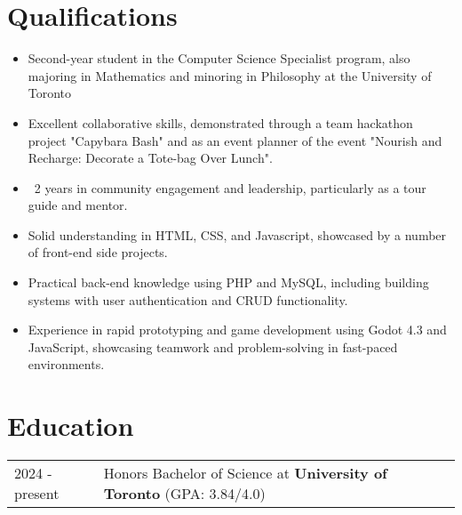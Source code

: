 \documentclass[a4paper,10pt]{article} %
\makeatletter
\newenvironment{joblong}[2]
    {
    \begin{tabularx}{\linewidth}{@{}l X r@{}}
    \textbf{#1} & \hfill &  #2 \\[3.75pt]
    \end{tabularx}
    \begin{minipage}[t]{\linewidth}
    \begin{itemize}[nosep,after=\strut, leftmargin=1em, itemsep=3pt,label=--]
    }
    {
    \end{itemize}
    \end{minipage}    
    }
\makeatother
\begin{document}


\section{Qualifications}
\begin{itemize}
    \item Second-year student in the Computer Science Specialist program, also majoring in Mathematics and minoring in Philosophy at the University of Toronto
    \item Excellent collaborative skills, demonstrated through a team hackathon project "Capybara Bash" and as an event planner of the event "Nourish and Recharge: Decorate a Tote-bag Over Lunch".
    \item ~2 years in community engagement and leadership, particularly as a tour guide and mentor.
    \item Solid understanding in HTML, CSS, and Javascript, showcased by a number of front-end side projects.
    \item Practical back-end knowledge using PHP and MySQL, including building systems with user authentication and CRUD functionality.
    \item Experience in rapid prototyping and game development using Godot 4.3 and JavaScript, showcasing teamwork and problem-solving in fast-paced environments.
\end{itemize}

\section{Education}
\begin{tabularx}{\linewidth}{@{}l X@{}}
    2024 - present & Honors Bachelor of Science at \textbf{University of Toronto} \hfill \normalsize (GPA: 3.84/4.0) \\
\end{tabularx}
\end{document}
